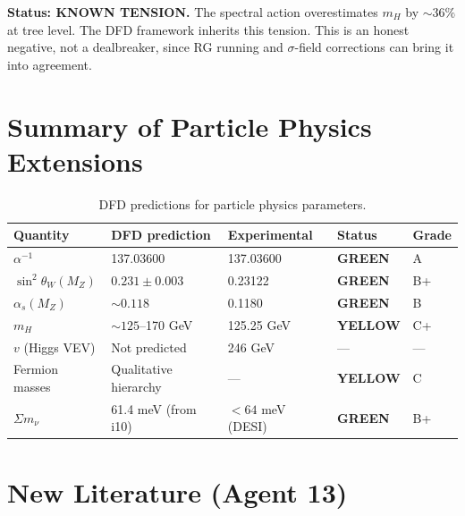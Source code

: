 \documentclass[11pt,a4paper]{article}
\newcommand{\GREEN}{\textcolor{dfdgreen}{\textbf{GREEN}}}
\newcommand{\YELLOW}{\textcolor{dfdyellow}{\textbf{YELLOW}}}
\begin{document}
\textbf{Status: KNOWN TENSION.} The spectral action overestimates $m_H$ by $\sim 36\%$ at tree level. The DFD framework inherits this tension. This is an honest negative, not a dealbreaker, since RG running and $\sigma$-field corrections can bring it into agreement.

\section{Summary of Particle Physics Extensions}

\begin{table}[h]
\centering
\begin{tabular}{lllll}
\toprule
\textbf{Quantity} & \textbf{DFD prediction} & \textbf{Experimental} & \textbf{Status} & \textbf{Grade} \\
\midrule
$\alpha^{-1}$ & 137.03600 & 137.03600 & \GREEN{} & A \\
$\sin^2\theta_W(M_Z)$ & $0.231 \pm 0.003$ & 0.23122 & \GREEN{} & B+ \\
$\alpha_s(M_Z)$ & $\sim 0.118$ & 0.1180 & \GREEN{} & B \\
$m_H$ & $\sim 125$--170 GeV & 125.25 GeV & \YELLOW{} & C+ \\
$v$ (Higgs VEV) & Not predicted & 246 GeV & --- & --- \\
Fermion masses & Qualitative hierarchy & --- & \YELLOW{} & C \\
$\Sigma m_\nu$ & 61.4 meV (from i10) & $< 64$ meV (DESI) & \GREEN{} & B+ \\
\bottomrule
\end{tabular}
\caption{DFD predictions for particle physics parameters.}
\end{table}

\section{New Literature (Agent 13)}
\end{document}

